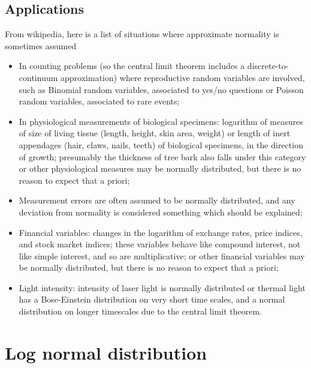 \subsection{Applications}
From wikipedia, here is a list of situations where approximate normality is sometimes assumed
\begin{itemize}
\item In counting problems (so the central limit theorem includes a discrete-to-continuum approximation) where reproductive random variables are involved, such as Binomial random variables, associated to yes/no questions or Poisson random variables, associated to rare events;
\item In physiological measurements of biological specimens: logarithm of measures of size of living tissue (length, height, skin area, weight) or length of inert appendages (hair, claws, nails, teeth) of biological specimens, in the direction of growth; presumably the thickness of tree bark also falls under this category or other physiological measures may be normally distributed, but there is no reason to expect that a priori;
\item Measurement errors are often assumed to be normally distributed, and any deviation from normality is considered something which should be explained;
\item Financial variables: changes in the logarithm of exchange rates, price indices, and stock market indices; these variables behave like compound interest, not like simple interest, and so are multiplicative; or  other financial variables may be normally distributed, but there is no reason to expect that a priori;
\item Light intensity: intensity of laser light is normally distributed or thermal light has a Bose-Einstein distribution on very short time scales, and a normal distribution on longer timescales due to the central limit theorem.
\end{itemize}

\section{Log normal distribution}
